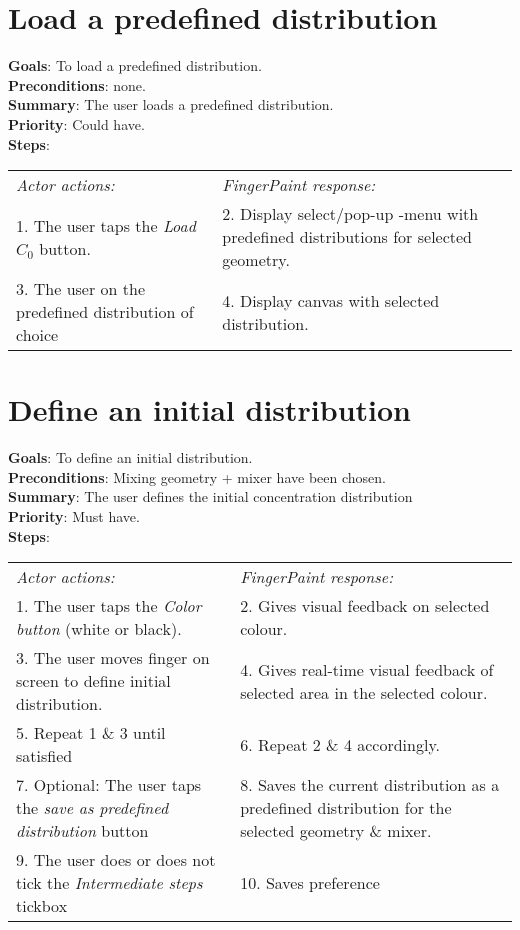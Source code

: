 \begin{appendices}
  \section{Load a predefined distribution}
  \textbf{Goals}: To load a predefined distribution.\\
  \textbf{Preconditions}: none.\\
  \textbf{Summary}: The user loads a predefined distribution.\\
  \textbf{Priority}: Could have.\\
  \textbf{Steps}: \\
  \begin{tabular}{ p{} p{} }
  	\emph{Actor actions:} & \emph{FingerPaint response:} \\
	1. The user taps the \emph{Load $C_0$} button. & 2. Display select/pop-up -menu with predefined distributions for selected geometry. \\
	3. The user on the predefined distribution of choice & 4.	Display canvas with selected distribution. \\
  \end{tabular}
  
  \section{Define an initial distribution}
  \textbf{Goals}: To define an initial distribution.\\
  \textbf{Preconditions}: Mixing geometry + mixer have been chosen.\\
  \textbf{Summary}: The user defines the initial concentration distribution\\
  \textbf{Priority}: Must have.\\
  \textbf{Steps}: \\
  \begin{tabular}{ p{} p{} }
  	\emph{Actor actions:} & \emph{FingerPaint response:} \\
	1. The user taps the \emph{Color button} (white or black). & 2. Gives visual feedback on selected colour. \\
	3. The user moves finger on screen to define initial distribution. & 4. Gives real-time visual feedback of selected area in the selected colour.\\
    5. Repeat 1 \& 3 until satisfied & 6.	Repeat 2 \& 4 accordingly. \\
    7.	Optional: The user taps the \emph{save as predefined distribution} button  & 8.	Saves the current distribution as a predefined distribution for the selected geometry \& mixer.\\
    9.	The user does or does not tick the \emph{Intermediate steps} tickbox & 10. Saves preference
  \end{tabular}


\end{appendices}

